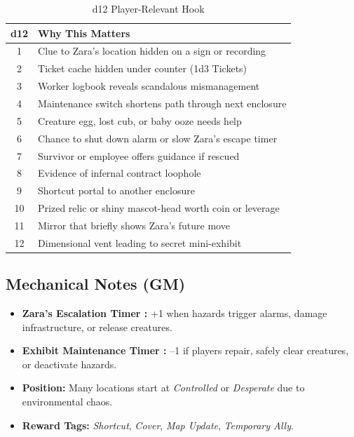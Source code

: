 \begin{table}[h]
\centering
\caption{d12 Player-Relevant Hook}
\label{tab:location-hook}
\begin{tabular}{@{}cl@{}}
\toprule
d12 & Why This Matters \\
\midrule
1 & Clue to Zara's location hidden on a sign or recording \\
2 & Ticket cache hidden under counter (1d3 Tickets) \\
3 & Worker logbook reveals scandalous mismanagement \\
4 & Maintenance switch shortens path through next enclosure \\
5 & Creature egg, lost cub, or baby ooze needs help \\
6 & Chance to shut down alarm or slow Zara's escape timer \\
7 & Survivor or employee offers guidance if rescued \\
8 & Evidence of infernal contract loophole \\
9 & Shortcut portal to another enclosure \\
10 & Prized relic or shiny mascot-head worth coin or leverage \\
11 & Mirror that briefly shows Zara's future move \\
12 & Dimensional vent leading to secret mini-exhibit \\
\bottomrule
\end{tabular}
\end{table}

\vspace{0.25cm}

\subsection*{Mechanical Notes (GM)}
\begin{itemize}
  \item \textbf{Zara's Escalation Timer :} +1 when hazards trigger alarms, damage infrastructure, or release creatures.
  \item \textbf{Exhibit Maintenance Timer :} --1 if players repair, safely clear creatures, or deactivate hazards.
  \item \textbf{Position:} Many locations start at \emph{Controlled} or \emph{Desperate} due to environmental chaos.
  \item \textbf{Reward Tags:} \emph{Shortcut}, \emph{Cover}, \emph{Map Update}, \emph{Temporary Ally}.
\end{itemize}